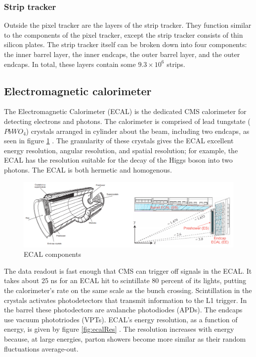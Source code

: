 \subsubsection{Strip tracker}

Outside the pixel tracker are the layers of the strip tracker. They function similar to the components of the pixel tracker, except the strip tracker consists of thin silicon plates. The strip tracker itself can be broken down into four components: the inner barrel layer, the inner endcaps, the outer barrel layer, and the outer endcaps. In total, these layers contain some $9.3 \times 10^6$ strips. 

\subsection{Electromagnetic calorimeter}

The Electromagnetic Calorimeter (ECAL) is the dedicated CMS calorimeter for detecting electrons and photons. The calorimeter is comprised of lead tungstate ($PbWO_4$) crystals arranged in cylinder about the beam, including two endcaps, as seen in figure \ref{fig:ecalComp} \cite{Benaglia:2014aqa}. The granularity of these crystals gives the ECAL excellent energy resolution, angular resolution, and spatial resolution; for example, the ECAL has the resolution suitable for the decay of the Higgs boson into two photons. The ECAL is both hermetic and homogenous. 

\begin{figure}[h!]
\begin{centering}
\includegraphics[width=7in]{Chapter3/importfigs/ecal_performance_with_examples.png}
\par\end{centering}
\caption{ECAL components \cite{Benaglia:2014aqa} \label{fig:ecalComp}}
\end{figure}

The data readout is fast enough that CMS can trigger off signals in the ECAL. It takes about 25 ns for an ECAL hit to scintillate 80 percent of its lights, putting the calorimeter's rate on the same scale as the bunch crossing. Scintillation in the crystals activates photodetectors that transmit information to the L1 trigger. In the barrel these photodectors are avalanche photodiodes (APDs). The endcaps use vacuum phototriodes (VPTs). ECAL's energy resolution, as a function of energy, is given by figure \ref{fig:ecalRes} \cite{Bayatian:2006nff}. The resolution increases with energy because, at large energies, parton showers become more similar as their random fluctuations average-out.

